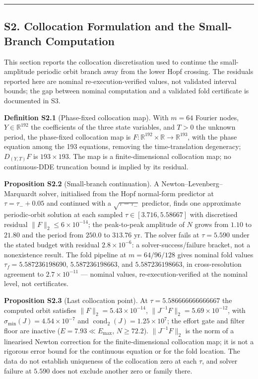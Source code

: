 \documentclass[
  10pt,
  a4paper,
]{article}
\begin{document}
\begin{center}\rule{0.5\linewidth}{0.5pt}\end{center}

\subsection{S2. Collocation Formulation and the Small-Branch
Computation}\label{s2.-collocation-formulation-and-the-small-branch-computation}

This section reports the collocation discretisation used to continue the
small-amplitude periodic orbit branch away from the lower Hopf crossing.
The residuals reported here are nominal re-execution-verified values,
not validated interval bounds; the gap between nominal computation and a
validated fold certificate is documented in S3.

\textbf{Definition S2.1} (Phase-fixed collocation map). With \(m = 64\)
Fourier nodes, \(Y \in \mathbb{R}^{192}\) the coefficients of the three
state variables, and \(T > 0\) the unknown period, the phase-fixed
collocation map is
\(F : \mathbb{R}^{192} \times \mathbb{R} \to \mathbb{R}^{193}\), with
the phase equation among the 193 equations, removing the
time-translation degeneracy; \(D_{(Y,T)}F\) is \(193 \times 193\). The
map is a finite-dimensional collocation map; no continuous-DDE
truncation bound is implied by its residual.

\textbf{Proposition S2.2} (Small-branch continuation). A
Newton--Levenberg--Marquardt solver, initialised from the Hopf
normal-form predictor at \(\tau = \tau_- + 0.05\) and continued with a
\(\sqrt{\tau - \tau_-}\) predictor, finds one approximate periodic-orbit
solution at each sampled \(\tau \in [3.716, 5.58667]\) with discretised
residual \(\|F\|_2 \le 6\times10^{-14}\); the peak-to-peak amplitude of
\(N\) grows from \(1.10\) to \(21.80\) and the period from \(250.0\) to
\(313.76\) yr. The solver fails at \(\tau = 5.590\) under the stated
budget with residual \(2.8\times10^{-6}\): a solver-success/failure
bracket, not a nonexistence result. The fold pipeline at
\(m = 64/96/128\) gives nominal fold values \(\tau_f = 5.587236198690\),
\(5.587236198663\), and \(5.587236198663\), in cross-resolution
agreement to \(2.7\times10^{-11}\) --- nominal values,
re-execution-verified at the nominal level, not certificates.

\textbf{Proposition S2.3} (Last collocation point). At
\(\tau = 5.586666666666667\) the computed orbit satisfies
\(\|F\|_2 = 5.43\times10^{-14}\),
\(\|J^{-1}F\|_2 = 5.69\times10^{-12}\), with
\(\sigma_{\min}(J) = 4.54\times10^{-7}\) and
\(\operatorname{cond}_2(J) = 1.25\times10^7\); the effort gate and
filter floor are inactive (\(E = 7.93 \ll E_{\max}\), \(N \ge 72.2\)).
\(\|J^{-1}F\|_2\) is the norm of a linearised Newton correction for the
finite-dimensional collocation map; it is not a rigorous error bound for
the continuous equation or for the fold location. The data do not
establish uniqueness of the collocation zero at each \(\tau\), and
solver failure at \(5.590\) does not exclude another zero or family
there.
\end{document}
